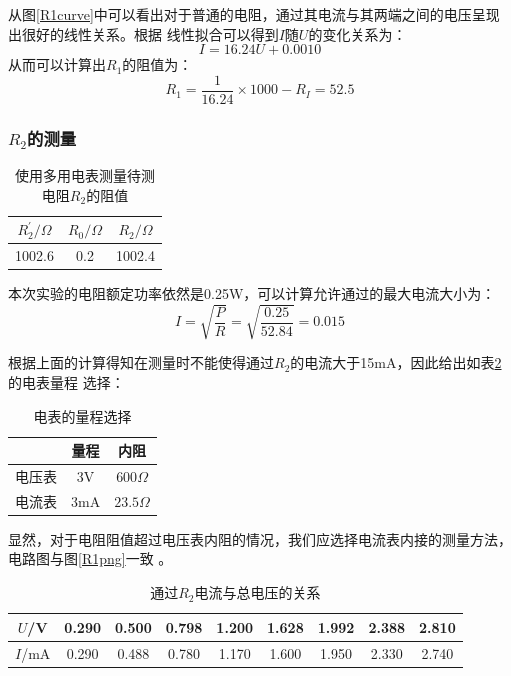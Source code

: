 \documentclass[a4paper]{ctexart}
\begin{document}
		\par 
		从图\ref{R1curve}中可以看出对于普通的电阻，通过其电流与其两端之间的电压呈现出很好的线性关系。根据
		线性拟合可以得到$I$随$U$的变化关系为：
		$$
		I = 16.24U + 0.0010
		$$
		从而可以计算出$R_1$的阻值为：
		$$
		R_1 = \frac{1}{16.24} \times{1000} - R_I = 52.5
		$$
		\subsubsection{$R_2$的测量}
		\begin{table}[htbp]
			\centering 
			\caption{使用多用电表测量待测电阻$R_2$的阻值}
			\begin{tabular}{ccc}
				\toprule
				$R_2^{'}/\Omega$ & $R_0/\Omega$ & $R_2/\Omega$ \\ 
				\midrule
				1002.6 & 0.2 & 1002.4\\
				\bottomrule
			\end{tabular}
			\label{R2_first}
		\end{table}
		\par 
		本次实验的电阻额定功率依然是0.25W，可以计算允许通过的最大电流大小为：
		$$
		I = \sqrt{\frac{P}{R}} = \sqrt{\frac{0.25}{52.84}} = 0.015
		$$
		\par 
		根据上面的计算得知在测量时不能使得通过$R_2$的电流大于15mA，因此给出如表\ref{expansion2}的电表量程
		选择：
		\begin{table}[htbp]
			\centering
			\caption{电表的量程选择}
			\label{expansion2}
			\begin{tabular}{ccc}
				\toprule
				& 量程 & 内阻\\
				\midrule
				电压表 & 3V & $600\Omega$\\
				电流表 & 3mA & $23.5\Omega$\\
				\bottomrule
			\end{tabular}
		\end{table}
		\par 
		显然，对于电阻阻值超过电压表内阻的情况，我们应选择电流表内接的测量方法，电路图与图\ref{R1png}一致
		。
		\begin{table}[htbp]
			\centering
			\caption{通过$R_2$电流与总电压的关系}
			\label{R2_relation}
			\begin{tabular}{ccccccccc}
				\toprule
				$U$/V & 0.290 & 0.500 & 0.798 & 1.200 & 1.628 & 1.992 & 2.388 & 2.810\\
				\midrule
				$I$/mA & 0.290 & 0.488 & 0.780 & 1.170 & 1.600 & 1.950 & 2.330 & 2.740\\
				\bottomrule
			\end{tabular}
		\end{table}
\end{document}
